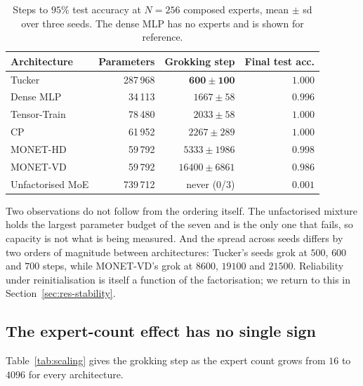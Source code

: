 \begin{table}[ht]
\centering
\caption{Steps to $95\%$ test accuracy at $N = 256$ composed experts, mean
$\pm$ sd over three seeds. The dense MLP has no experts and is shown for
reference.}
\label{tab:headline}
\begin{tabular}{lrrr}
\toprule
Architecture & Parameters & Grokking step & Final test acc. \\
\midrule
Tucker            &  287\,968 & $\mathbf{600 \pm 100}$ & $1.000$ \\
Dense MLP         &   34\,113 & $1667 \pm 58$          & $0.996$ \\
Tensor-Train      &   78\,480 & $2033 \pm 58$          & $1.000$ \\
CP                &   61\,952 & $2267 \pm 289$         & $1.000$ \\
MONET-HD          &   59\,792 & $5333 \pm 1986$        & $0.998$ \\
MONET-VD          &   59\,792 & $16400 \pm 6861$       & $0.986$ \\
Unfactorised MoE  &  739\,712 & never (0/3)            & $0.001$ \\
\bottomrule
\end{tabular}
\end{table}

Two observations do not follow from the ordering itself. The unfactorised
mixture holds the largest parameter budget of the seven and is the only one
that fails, so capacity is not what is being measured. And the spread across
seeds differs by two orders of magnitude between architectures: Tucker's seeds
grok at $500$, $600$ and $700$ steps, while MONET-VD's grok at $8600$, $19100$
and $21500$. Reliability under reinitialisation is itself a function of the
factorisation; we return to this in Section~\ref{sec:res-stability}.

\subsection{The expert-count effect has no single sign}
\label{sec:res-scaling}

Table~\ref{tab:scaling} gives the grokking step as the expert count grows from
$16$ to $4096$ for every architecture.

